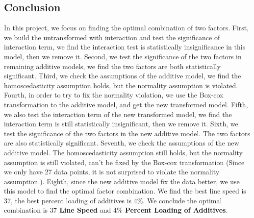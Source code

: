 \documentclass[11pt,a4paper]{article}
\begin{document}
\subsection{Conclusion}
In this project, we focus on finding the optimal combination of two factors. First, we build the untransformed with interaction and test the significance of interaction term, we find the interaction test is statistically insignificance in this model, then we remove it. Second, we test the significance of the two factors in remaining additive models, we find the two factors are both statistically significant. Third, we check the assumptions of the additive model, we find the homoscedasticity assumption holds, but the normality assumption is violated. Fourth, in order to try to fix the normality violation, we use the Box-cox transformation to the additive model, and get the new transformed model. Fifth, we also test the interaction term of the new transformed model, we find the interaction term is still statistically insignificant, then we remove it. Sixth, we test the significance of the two factors in the new additive model. The two factors are also statistically significant. Seventh, we check the assumptions of the new additive model. The homoscedasticity assumption still holds, but the normality assumption is still violated, can't be fixed by the Box-cox transformation (Since we only have 27 data points, it is not surprised to violate the normality assumption.). Eighth, since the new additive model fix the data better, we use this model to find the optimal factor combination. We find the best line speed is 37, the best percent loading of additives is 4\%. We conclude the optimal combination is \textbf{$37$ Line Speed} and \textbf{$4\%$ Percent Loading of Additives}.



\newpage
\end{document}
